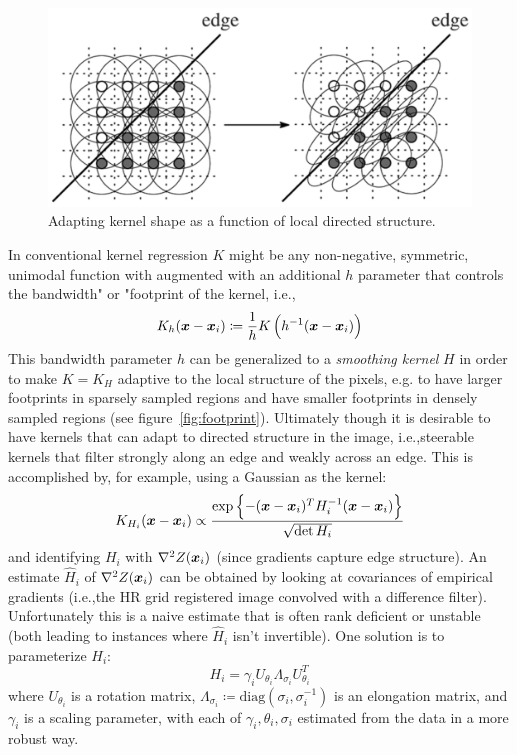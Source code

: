 \begin{figure}
    \centering
    \includegraphics[width=\linewidth,keepaspectratio]{figures/classical/steering.png}
    \caption{Adapting kernel shape as a function of local directed structure\cite{Takeda2007}.}
    \label{fig:steering}
\end{figure}
In conventional kernel regression \(K\) might be any non-negative, symmetric, unimodal\cite{wand1994kernel} function with augmented with an additional \(h\) parameter that controls the bandwidth" or "footprint of the kernel, i.e.,\begin{equation}
                                                                                                                                                                                                                                          K_h(\bm{x} - \bm{x}_i) \coloneqq \frac{1}{h}K\left( h^{-1}(\bm{x} - \bm{x}_i) \right)
\end{equation}
This bandwidth parameter \(h\) can be generalized to a \textit{smoothing kernel} \(H\) in order to make \(K = K_H\) adaptive to the local structure of the pixels, e.g. to have larger footprints in sparsely sampled regions and have smaller footprints in densely sampled regions (see figure~\ref{fig:footprint}).
%
Ultimately though it is desirable to have kernels that can adapt to directed structure in the image, i.e.,steerable kernels that filter strongly along an edge and weakly across an edge.
%
This is accomplished by, for example, using a Gaussian as the kernel:
\begin{equation}
    K_{H_i}(\bm{x} - \bm{x}_i) \propto \frac{\exp\left\{ -(\bm{x} - \bm{x}_i)^T H^{-1}_i (\bm{x} - \bm{x}_i) \right\}}{\sqrt{\det{H_i}}}
\end{equation}
and identifying \(H_i\) with \(\nabla^2 Z(\bm{x}_i)\) (since gradients capture edge structure).
%
An estimate \(\hat{H}_i\) of \(\nabla^2 Z(\bm{x}_i)\) can be obtained by looking at covariances of empirical gradients (i.e.,the HR grid registered image convolved with a difference filter).
%
Unfortunately this is a naive estimate that is often rank deficient or unstable (both leading to instances where \(\hat{H}_i\) isn't invertible).
%
One solution is to parameterize \(H_i\):
\[
    H_i = \gamma_i U_{\theta_i} \Lambda_{\sigma_i} U_{\theta_i}^T
\]
where \(U_{\theta_i}\) is a rotation matrix, \(\Lambda_{\sigma_i} \coloneqq \text{diag}\left( \sigma_i, \sigma_i^{-1} \right)\) is an elongation matrix, and \(\gamma_i\) is a scaling parameter, with each of \(\gamma_i, \theta_i, \sigma_i\) estimated from the data in a more robust way.
%
